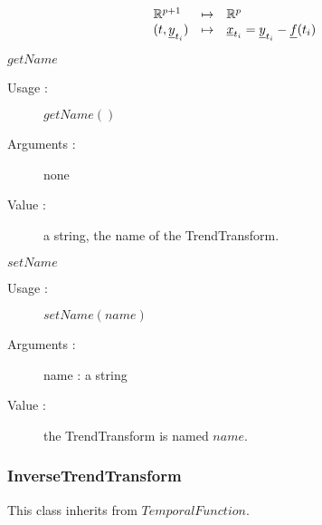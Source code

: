 \begin{description}
\begin{description}
\begin{description}
\begin{equation}
\begin{array}{lcl}\label{Inverse}
  \mathbb{R}^{p+1} & \mapsto & \mathbb{R}^{p} \\
  (t,{\underline{y}}_{t_i}) & \mapsto & {\underline{x}}_{t_i} = {\underline{y}}_{t_i} - {\underline{f}}(t_i)
\end{array}
\end{equation} 
    \end{description}
    \bigskip

  \item $getName$
    \begin{description}
    \item[Usage :] $getName()$
    \item[Arguments :] none
    \item[Value :] a string, the name of the TrendTransform.
    \end{description}
    \bigskip

  \item $setName$
    \begin{description}
    \item[Usage :] $setName(name)$
    \item[Arguments :] name : a string
    \item[Value :] the TrendTransform is named $name$.
    \end{description}
    \bigskip


  \end{description}

\end{description}

\newpage \subsubsection{InverseTrendTransform}

This class inherits from $TemporalFunction$.

